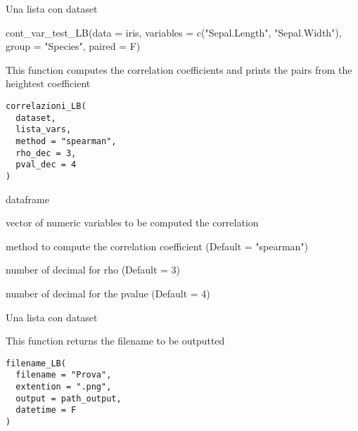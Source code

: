 \documentclass[a4paper]{book}
\begin{document}
%
\begin{Value}
Una lista con dataset
\end{Value}
%
\begin{Examples}
\begin{ExampleCode}
cont_var_test_LB(data = iris, variables = c("Sepal.Length", "Sepal.Width"), group = "Species", paired = F)
\end{ExampleCode}
\end{Examples}
%
\begin{Description}
This function computes the correlation coefficients and prints the pairs from the heightest coefficient
\end{Description}
%
\begin{Usage}
\begin{verbatim}
correlazioni_LB(
  dataset,
  lista_vars,
  method = "spearman",
  rho_dec = 3,
  pval_dec = 4
)
\end{verbatim}
\end{Usage}
%
\begin{Arguments}
\begin{ldescription}
\item[\code{dataset}] dataframe

\item[\code{lista\_vars}] vector of numeric variables to be computed the correlation

\item[\code{method}] method to compute the correlation coefficient (Default = "spearman")

\item[\code{rho\_dec}] number of decimal for rho (Default = 3)

\item[\code{pval\_dec}] number of decimal for the pvalue (Default = 4)
\end{ldescription}
\end{Arguments}
%
\begin{Value}
Una lista con dataset
\end{Value}
%
\begin{Description}
This function returns the filename to be outputted
\end{Description}
%
\begin{Usage}
\begin{verbatim}
filename_LB(
  filename = "Prova",
  extention = ".png",
  output = path_output,
  datetime = F
)
\end{verbatim}
\end{Usage}
\end{document}
